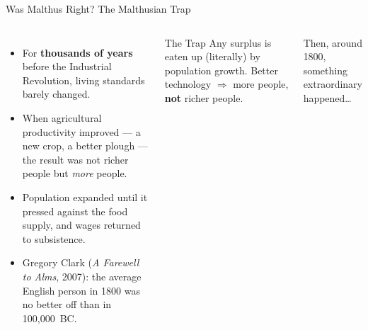 \documentclass[aspectratio=169, 10pt]{beamer}
\begin{document}
\begin{frame}{Was Malthus Right? The Malthusian Trap}
\begin{columns}[T]
\begin{itemize}
  \item For \textbf{thousands of years} before the Industrial Revolution,
        living standards barely changed.
  \item When agricultural productivity improved --- a new crop,
        a better plough --- the result was not richer people but
        \textit{more} people.
  \item Population expanded until it pressed against
        the food supply, and wages returned to subsistence.
  \item Gregory Clark (\textit{A Farewell to Alms}, 2007):
        the average English person in 1800 was no better off
        than in 100,000~BC.
\end{itemize}
\begin{alertblock}{The Trap}
  Any surplus is eaten up (literally) by population growth.
  Better technology $\Rightarrow$ more people, \textbf{not} richer people.
\end{alertblock}
\vspace{0.5em}
Then, around 1800, something extraordinary happened\ldots
\end{columns}
\end{frame}
\end{document}
